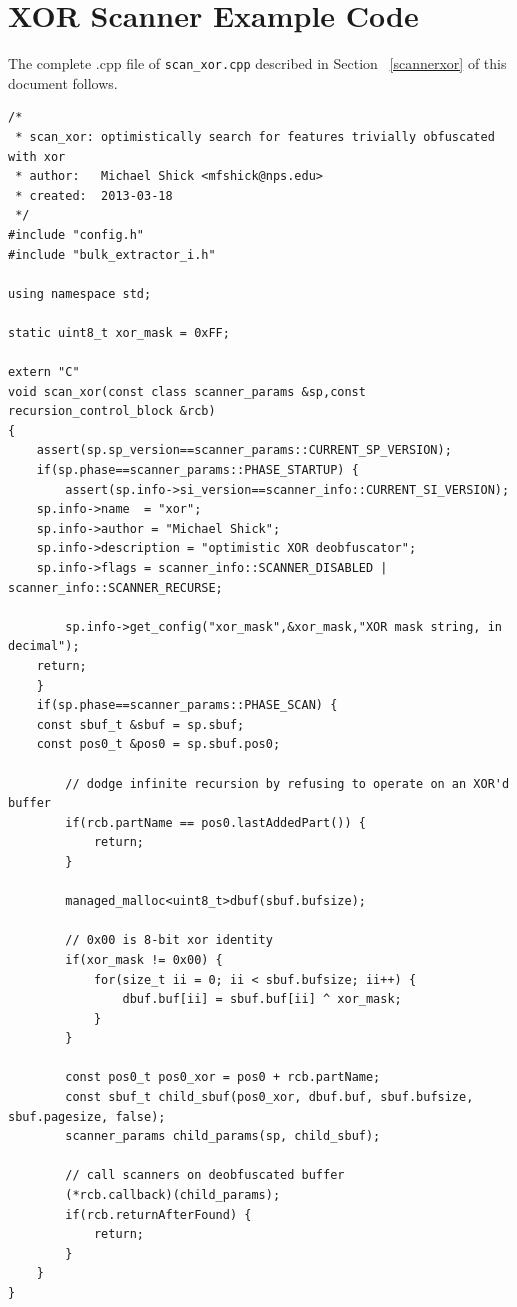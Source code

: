 \documentclass[11pt,fleqn]{article} %
\begin{document}
\section{XOR Scanner Example Code}
The complete .cpp file of \texttt{scan\_xor.cpp} described in Section ~\ref{scannerxor} of this document follows.\lstset{language=C++}
\lstset{basicstyle=\footnotesize}
\lstset{breaklines=true}
\lstset{breakatwhitespace=true}
\begin{lstlisting}[frame=single,label=XORScanner]
/*
 * scan_xor: optimistically search for features trivially obfuscated with xor
 * author:   Michael Shick <mfshick@nps.edu>
 * created:  2013-03-18
 */
#include "config.h"
#include "bulk_extractor_i.h"

using namespace std;

static uint8_t xor_mask = 0xFF;

extern "C"
void scan_xor(const class scanner_params &sp,const recursion_control_block &rcb)
{
    assert(sp.sp_version==scanner_params::CURRENT_SP_VERSION);
    if(sp.phase==scanner_params::PHASE_STARTUP) {
        assert(sp.info->si_version==scanner_info::CURRENT_SI_VERSION);
	sp.info->name  = "xor";
	sp.info->author = "Michael Shick";
	sp.info->description = "optimistic XOR deobfuscator";
	sp.info->flags = scanner_info::SCANNER_DISABLED | scanner_info::SCANNER_RECURSE;

        sp.info->get_config("xor_mask",&xor_mask,"XOR mask string, in decimal");
	return;
    }
    if(sp.phase==scanner_params::PHASE_SCAN) {
	const sbuf_t &sbuf = sp.sbuf;
	const pos0_t &pos0 = sp.sbuf.pos0;

        // dodge infinite recursion by refusing to operate on an XOR'd buffer
        if(rcb.partName == pos0.lastAddedPart()) {
            return;
        }

        managed_malloc<uint8_t>dbuf(sbuf.bufsize);
        
        // 0x00 is 8-bit xor identity
        if(xor_mask != 0x00) {
            for(size_t ii = 0; ii < sbuf.bufsize; ii++) {
                dbuf.buf[ii] = sbuf.buf[ii] ^ xor_mask;
            }
        }

        const pos0_t pos0_xor = pos0 + rcb.partName;
        const sbuf_t child_sbuf(pos0_xor, dbuf.buf, sbuf.bufsize, sbuf.pagesize, false);
        scanner_params child_params(sp, child_sbuf);
    
        // call scanners on deobfuscated buffer
        (*rcb.callback)(child_params);
        if(rcb.returnAfterFound) {
            return;
        }
    }
}

\end{lstlisting}
\end{document}
